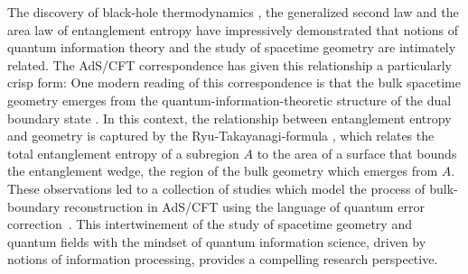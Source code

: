 \documentclass[aps,pra,reprint,superscriptaddress]{revtex4-2}
\theoremstyle{definition}
\theoremstyle{remark}
\begin{document}
The discovery of black-hole thermodynamics \cite{Bardeen:1973gs,Hawking1975}, the generalized
second law \cite{Bekenstein:1974ax} and the area law of
entanglement entropy \cite{Bombelli:1986rw,Srednicki:1993im,Eisert2010} 
have impressively 
demonstrated that notions of quantum information
theory and the study of spacetime geometry are intimately related. The AdS/CFT
correspondence \cite{tHooft:1993dmi,Susskind:1994vu,Maldacena:1997re,Witten:1998qj} has given this
relationship a particularly %
crisp form: One modern reading of this correspondence is that the bulk spacetime geometry 
emerges from the quantum-information-theoretic structure of the dual boundary
state \cite{Ryu:2006bv,Hubeny:2007xt,VanRaamsdonk:2010pw,Lewkowycz:2013nqa,Faulkner:2013ana,Jafferis:2015del}. In this context, the relationship between entanglement entropy and geometry is
captured
by the Ryu-Takayanagi-formula \cite{Ryu:2006bv}, which relates the total entanglement entropy of a
subregion $A$ to the area of a surface that bounds the entanglement wedge, the region of the bulk geometry which emerges from $A$. These observations led to a collection of studies which model the process of bulk-boundary reconstruction in AdS/CFT using the language of quantum error correction~\cite{Almheiri:2014lwa, Dong:2016eik, Harlow:2016vwg, Pastawski:2015qua, Jahn2019, Cree2021, AnglesMunne2022, Steinberg2024}.
This intertwinement of the study of spacetime geometry and quantum fields with the mindset of quantum information science, 
driven by notions of information processing, provides a compelling research perspective.
\end{document}

